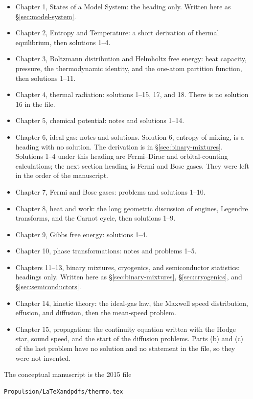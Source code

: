 \begin{itemize}
\item Chapter 1, States of a Model System: the heading only. Written here as \S\ref{sec:model-system}.
\item Chapter 2, Entropy and Temperature: a short derivation of thermal equilibrium, then solutions 1--4.
\item Chapter 3, Boltzmann distribution and Helmholtz free energy: heat capacity, pressure, the thermodynamic identity, and the one-atom partition function, then solutions 1--11.
\item Chapter 4, thermal radiation: solutions 1--15, 17, and 18. There is no solution 16 in the file.
\item Chapter 5, chemical potential: notes and solutions 1--14.
\item Chapter 6, ideal gas: notes and solutions. Solution 6, entropy of mixing, is a heading with no solution. The derivation is in \S\ref{sec:binary-mixtures}. Solutions 1--4 under this heading are Fermi--Dirac and orbital-counting calculations; the next section heading is Fermi and Bose gases. They were left in the order of the manuscript.
\item Chapter 7, Fermi and Bose gases: problems and solutions 1--10.
\item Chapter 8, heat and work: the long geometric discussion of engines, Legendre transforms, and the Carnot cycle, then solutions 1--9.
\item Chapter 9, Gibbs free energy: solutions 1--4.
\item Chapter 10, phase transformations: notes and problems 1--5.
\item Chapters 11--13, binary mixtures, cryogenics, and semiconductor statistics: headings only. Written here as \S\ref{sec:binary-mixtures}, \S\ref{sec:cryogenics}, and \S\ref{sec:semiconductors}.
\item Chapter 14, kinetic theory: the ideal-gas law, the Maxwell speed distribution, effusion, and diffusion, then the mean-speed problem.
\item Chapter 15, propagation: the continuity equation written with the Hodge star, sound speed, and the start of the diffusion problems. Parts (b) and (c) of the last problem have no solution and no statement in the file, so they were not invented.
\end{itemize}

The conceptual manuscript is the 2015 file

\begin{center}
\texttt{Propulsion/LaTeXandpdfs/thermo.tex}
\end{center}

